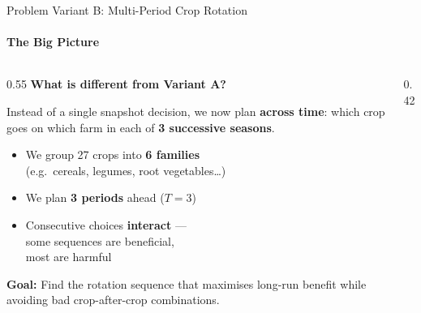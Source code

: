 \documentclass[aspectratio=169,10pt]{beamer}
\begin{document}
\begin{frame}{Problem Variant B: Multi-Period Crop Rotation}
    \framesubtitle{The Big Picture}

    \begin{columns}[T]
        \begin{column}{0.55\textwidth}
            \textbf{What is different from Variant A?}
            \vspace{0.3cm}

            Instead of a single snapshot decision, we now plan
            \textbf{across time}: which crop goes on which farm
            in each of \textbf{3 successive seasons}.

            \vspace{0.3cm}
            \begin{itemize}
                \item We group 27 crops into \textbf{6 families}\\
                      {\small (e.g.\ cereals, legumes, root vegetables\ldots)}
                \item We plan \textbf{3 periods} ahead ($T = 3$)
                \item Consecutive choices \textbf{interact} ---\\
                      some sequences are beneficial,\\
                      most are harmful
            \end{itemize}

            \vspace{0.3cm}
            \textbf{Goal:} Find the rotation sequence that
            maximises long-run benefit while avoiding
            bad crop-after-crop combinations.
        \end{column}
        \begin{column}{0.42\textwidth}
        \end{column}
    \end{columns}
\end{frame}
\end{document}
